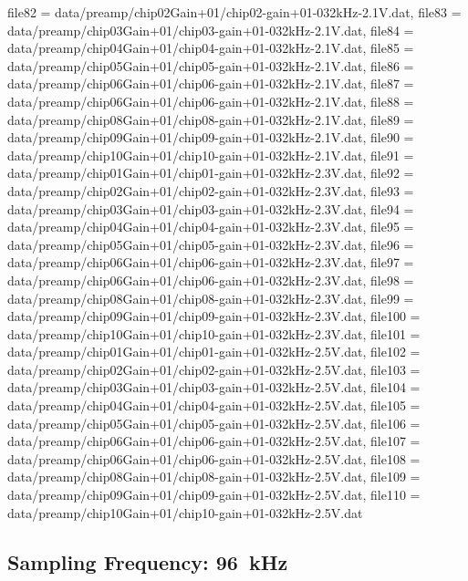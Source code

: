 {    file82         = data/preamp/chip02Gain+01/chip02-gain+01-032kHz-2.1V.dat,
    file83         = data/preamp/chip03Gain+01/chip03-gain+01-032kHz-2.1V.dat,
    file84         = data/preamp/chip04Gain+01/chip04-gain+01-032kHz-2.1V.dat,
    file85         = data/preamp/chip05Gain+01/chip05-gain+01-032kHz-2.1V.dat,
    file86         = data/preamp/chip06Gain+01/chip06-gain+01-032kHz-2.1V.dat,
    file87         = data/preamp/chip06Gain+01/chip06-gain+01-032kHz-2.1V.dat,
    file88         = data/preamp/chip08Gain+01/chip08-gain+01-032kHz-2.1V.dat,
    file89         = data/preamp/chip09Gain+01/chip09-gain+01-032kHz-2.1V.dat,
    file90         = data/preamp/chip10Gain+01/chip10-gain+01-032kHz-2.1V.dat,
    file91         = data/preamp/chip01Gain+01/chip01-gain+01-032kHz-2.3V.dat,
    file92         = data/preamp/chip02Gain+01/chip02-gain+01-032kHz-2.3V.dat,
    file93         = data/preamp/chip03Gain+01/chip03-gain+01-032kHz-2.3V.dat,
    file94         = data/preamp/chip04Gain+01/chip04-gain+01-032kHz-2.3V.dat,
    file95         = data/preamp/chip05Gain+01/chip05-gain+01-032kHz-2.3V.dat,
    file96         = data/preamp/chip06Gain+01/chip06-gain+01-032kHz-2.3V.dat,
    file97         = data/preamp/chip06Gain+01/chip06-gain+01-032kHz-2.3V.dat,
    file98         = data/preamp/chip08Gain+01/chip08-gain+01-032kHz-2.3V.dat,
    file99         = data/preamp/chip09Gain+01/chip09-gain+01-032kHz-2.3V.dat,
    file100        = data/preamp/chip10Gain+01/chip10-gain+01-032kHz-2.3V.dat,
    file101        = data/preamp/chip01Gain+01/chip01-gain+01-032kHz-2.5V.dat,
    file102        = data/preamp/chip02Gain+01/chip02-gain+01-032kHz-2.5V.dat,
    file103        = data/preamp/chip03Gain+01/chip03-gain+01-032kHz-2.5V.dat,
    file104        = data/preamp/chip04Gain+01/chip04-gain+01-032kHz-2.5V.dat,
    file105        = data/preamp/chip05Gain+01/chip05-gain+01-032kHz-2.5V.dat,
    file106        = data/preamp/chip06Gain+01/chip06-gain+01-032kHz-2.5V.dat,
    file107        = data/preamp/chip06Gain+01/chip06-gain+01-032kHz-2.5V.dat,
    file108        = data/preamp/chip08Gain+01/chip08-gain+01-032kHz-2.5V.dat,
    file109        = data/preamp/chip09Gain+01/chip09-gain+01-032kHz-2.5V.dat,
    file110        = data/preamp/chip10Gain+01/chip10-gain+01-032kHz-2.5V.dat}


\subsection{Sampling Frequency: \SI{96}{\kilo\hertz}}
\label{app:subsec:preamp:96kHz}

